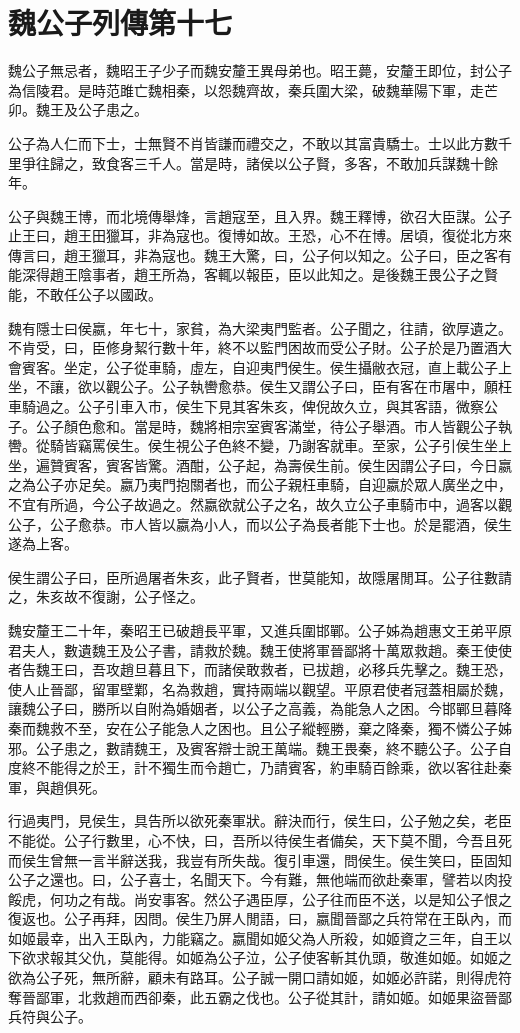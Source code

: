 \chapter{魏公子列傳第十七}

魏公子無忌者，魏昭王子少子而魏安釐王異母弟也。昭王薨，安釐王即位，封公子為信陵君。是時范雎亡魏相秦，以怨魏齊故，秦兵圍大梁，破魏華陽下軍，走芒卯。魏王及公子患之。

公子為人仁而下士，士無賢不肖皆謙而禮交之，不敢以其富貴驕士。士以此方數千里爭往歸之，致食客三千人。當是時，諸侯以公子賢，多客，不敢加兵謀魏十餘年。

公子與魏王博，而北境傳舉烽，言趙寇至，且入界。魏王釋博，欲召大臣謀。公子止王曰，趙王田獵耳，非為寇也。復博如故。王恐，心不在博。居頃，復從北方來傳言曰，趙王獵耳，非為寇也。魏王大驚，曰，公子何以知之。公子曰，臣之客有能深得趙王陰事者，趙王所為，客輒以報臣，臣以此知之。是後魏王畏公子之賢能，不敢任公子以國政。

魏有隱士曰侯嬴，年七十，家貧，為大梁夷門監者。公子聞之，往請，欲厚遺之。不肯受，曰，臣修身絜行數十年，終不以監門困故而受公子財。公子於是乃置酒大會賓客。坐定，公子從車騎，虛左，自迎夷門侯生。侯生攝敝衣冠，直上載公子上坐，不讓，欲以觀公子。公子執轡愈恭。侯生又謂公子曰，臣有客在市屠中，願枉車騎過之。公子引車入市，侯生下見其客朱亥，俾倪故久立，與其客語，微察公子。公子顏色愈和。當是時，魏將相宗室賓客滿堂，待公子舉酒。市人皆觀公子執轡。從騎皆竊罵侯生。侯生視公子色終不變，乃謝客就車。至家，公子引侯生坐上坐，遍贊賓客，賓客皆驚。酒酣，公子起，為壽侯生前。侯生因謂公子曰，今日嬴之為公子亦足矣。嬴乃夷門抱關者也，而公子親枉車騎，自迎嬴於眾人廣坐之中，不宜有所過，今公子故過之。然嬴欲就公子之名，故久立公子車騎市中，過客以觀公子，公子愈恭。市人皆以嬴為小人，而以公子為長者能下士也。於是罷酒，侯生遂為上客。

侯生謂公子曰，臣所過屠者朱亥，此子賢者，世莫能知，故隱屠閒耳。公子往數請之，朱亥故不復謝，公子怪之。

魏安釐王二十年，秦昭王已破趙長平軍，又進兵圍邯鄲。公子姊為趙惠文王弟平原君夫人，數遺魏王及公子書，請救於魏。魏王使將軍晉鄙將十萬眾救趙。秦王使使者告魏王曰，吾攻趙旦暮且下，而諸侯敢救者，已拔趙，必移兵先擊之。魏王恐，使人止晉鄙，留軍壁鄴，名為救趙，實持兩端以觀望。平原君使者冠蓋相屬於魏，讓魏公子曰，勝所以自附為婚姻者，以公子之高義，為能急人之困。今邯鄲旦暮降秦而魏救不至，安在公子能急人之困也。且公子縱輕勝，棄之降秦，獨不憐公子姊邪。公子患之，數請魏王，及賓客辯士說王萬端。魏王畏秦，終不聽公子。公子自度終不能得之於王，計不獨生而令趙亡，乃請賓客，約車騎百餘乘，欲以客往赴秦軍，與趙俱死。

行過夷門，見侯生，具告所以欲死秦軍狀。辭決而行，侯生曰，公子勉之矣，老臣不能從。公子行數里，心不快，曰，吾所以待侯生者備矣，天下莫不聞，今吾且死而侯生曾無一言半辭送我，我豈有所失哉。復引車還，問侯生。侯生笑曰，臣固知公子之還也。曰，公子喜士，名聞天下。今有難，無他端而欲赴秦軍，譬若以肉投餒虎，何功之有哉。尚安事客。然公子遇臣厚，公子往而臣不送，以是知公子恨之復返也。公子再拜，因問。侯生乃屏人閒語，曰，嬴聞晉鄙之兵符常在王臥內，而如姬最幸，出入王臥內，力能竊之。嬴聞如姬父為人所殺，如姬資之三年，自王以下欲求報其父仇，莫能得。如姬為公子泣，公子使客斬其仇頭，敬進如姬。如姬之欲為公子死，無所辭，顧未有路耳。公子誠一開口請如姬，如姬必許諾，則得虎符奪晉鄙軍，北救趙而西卻秦，此五霸之伐也。公子從其計，請如姬。如姬果盜晉鄙兵符與公子。

